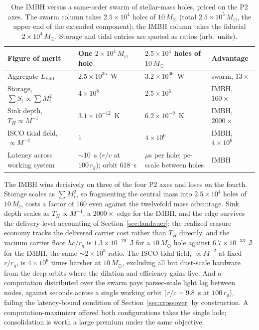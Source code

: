 \documentclass[11pt]{article}
\newcommand{\msun}{\ensuremath{M_\odot}}
\begin{document}
\begin{table}[tbp]
\centering
\caption{One IMBH versus a same-order swarm of stellar-mass holes, priced on the P2 axes. The swarm column takes $2.5\times10^{4}$ holes of $10\,\msun$ (total $2.5\times10^{5}\,\msun$, the upper end of the \citealt{BanaresHernandez2025} extended component); the IMBH column takes the fiducial $2\times10^{4}\,\msun$. Storage and tidal entries are quoted as ratios (arb.\ units).}
\label{tab:swarmcompare}
\small
\begin{tabular}{p{4.2cm}p{2.9cm}p{3.4cm}p{2.2cm}}
\toprule
Figure of merit & One $2\times10^{4}\,\msun$ hole & $2.5\times10^{4}$ holes of $10\,\msun$ & Advantage \\
\midrule
Aggregate $L_{\mathrm{Edd}}$ & $2.5\times10^{35}$~W & $3.2\times10^{36}$~W & swarm, $13\times$ \\
Storage, $\sum S_i \propto \sum M_i^{2}$ & $4\times10^{8}$ & $2.5\times10^{6}$ & IMBH, $160\times$ \\
Sink depth, $T_H \propto M^{-1}$ & $3.1\times10^{-12}$~K & $6.2\times10^{-9}$~K & IMBH, $2000\times$ \\
ISCO tidal field, $\propto M^{-2}$ & 1 & $4\times10^{6}$ & IMBH, $4\times10^{6}$ \\
Latency across working system & $\sim$10~s ($r/c$ at $100\,r_g$); orbit 618~s & $\mu$s per hole; pc-scale between holes & IMBH \\
\bottomrule
\end{tabular}
\end{table}

The IMBH wins decisively on three of the four P2 axes and loses on the fourth. Storage scales as $\sum M_i^{2}$, so fragmenting the central mass into $2.5\times10^{4}$ holes of $10\,\msun$ costs a factor of 160 even against the twelvefold mass advantage. Sink depth scales as $T_H \propto M^{-1}$, a $2000\times$ edge for the IMBH, and the edge survives the delivery-level accounting of Section~\ref{sec:landauer}: the realized erasure economy tracks the delivered carrier cost rather than $T_H$ directly, and the vacuum carrier floor $hc/r_g$ is $1.3\times10^{-29}$~J for a $10\,\msun$ hole against $6.7\times10^{-33}$~J for the IMBH, the same $\sim$$2\times10^{3}$ ratio. The ISCO tidal field, $\propto M^{-2}$ at fixed $r/r_g$, is $4\times10^{6}$ times harsher at $10\,\msun$, excluding all but dust-scale hardware from the deep orbits where the dilation and efficiency gains live. And a computation distributed over the swarm pays parsec-scale light lag between nodes, against seconds across a single working orbit ($r/c = 9.8$~s at $100\,r_g$), failing the latency-bound condition of Section~\ref{sec:crossover} by construction. A computation-maximizer offered both configurations takes the single hole; consolidation is worth a large premium under the same objective.
\end{document}
